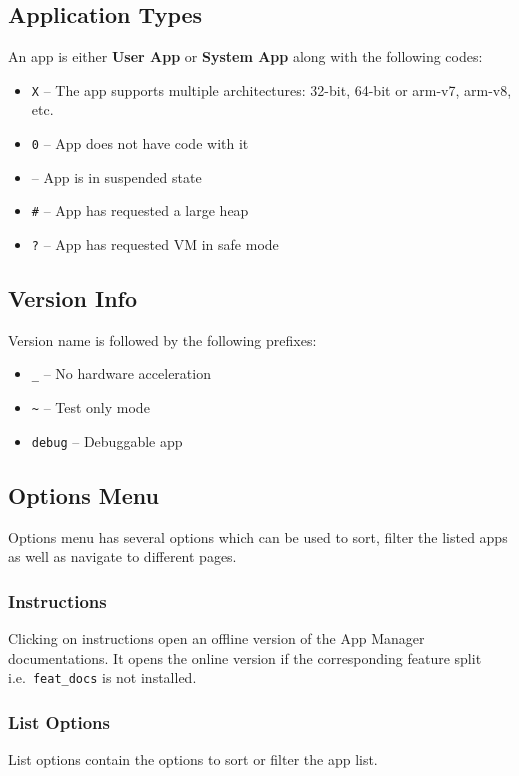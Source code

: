 \subsection{Application Types}\label{subsec:main-page-application-types}
An app is either \textbf{User App} or \textbf{System App} along with the following codes:
\begin{itemize}
    \item \texttt{X} -- The app supports multiple architectures: 32-bit, 64-bit or arm-v7, arm-v8, etc.
    \item \texttt{0} -- App does not have code with it
    \item \texttt{\textdegree} -- App is in suspended state
    \item \texttt{\#} -- App has requested a large heap
    \item \texttt{?} -- App has requested VM in safe mode
\end{itemize}

\subsection{Version Info}\label{subsec:main-page-version-info}
Version name is followed by the following prefixes:
\begin{itemize}
    \item \texttt{\_} -- No hardware acceleration
    \item \texttt{\textasciitilde} -- Test only mode
    \item \texttt{debug} -- Debuggable app
\end{itemize}

\subsection{Options Menu}\label{subsec:main-page-options-menu}
Options menu has several options which can be used to sort, filter the listed apps as well as navigate to different pages.

\subsubsection{Instructions}
Clicking on instructions open an offline version of the App Manager documentations. It opens the online version if the
corresponding feature split i.e.\ \texttt{feat\_docs} is not installed.

\subsubsection{List Options}
List options contain the options to sort or filter the app list.

